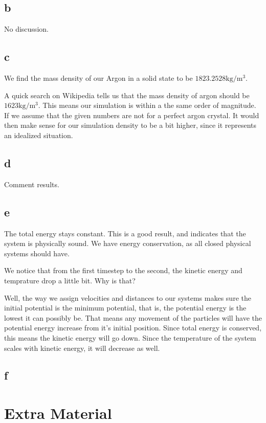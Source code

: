 \documentclass[10pt,showpacs,preprintnumbers,footinbib,amsmath,amssymb,aps,prl,twocolumn,groupedaddress,superscriptaddress,showkeys]{revtex4-1}
\begin{document}
\subsection*{b}

No discussion.

\subsection*{c}

We find the mass density of our Argon in a solid state to be $1823.2528 \mathrm{kg/m^3}$.

A quick search on Wikipedia tells us that the mass density of argon should be $1623\mathrm{kg/m^3}$. This means our simulation is within a the same order of magnitude. If we assume that the given numbers are not for a perfect argon crystal. It would then make sense for our simulation density to be a bit higher, since it represents an idealized situation.

\subsection*{d}

Comment results.

\subsection*{e}

The total energy stays constant. This is a good result, and indicates that the system is physically sound. We have energy conservation, as all closed physical systems should have.

We notice that from the first timestep to the second, the kinetic energy and temprature drop a little bit. Why is that?

Well, the way we assign velocities and distances to our systems makes sure the initial potential is the minimum potential, that is, the potential energy is the lowest it can possibly be. That means any movement of the particles will have the potential energy increase from it's initial position. Since total energy is conserved, this means the kinetic energy will go down. Since the temperature of the system scales with kinetic energy, it will decrease as well.


\subsection*{f}

\section{Extra Material}
\begin{thebibliography}{99}
\end{thebibliography}
\end{document}
